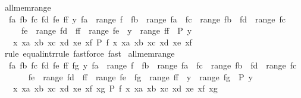 \begin{isabellebody}
{\isafoldproof}%
%
\isadelimproof
\isanewline
%
\endisadelimproof
\isanewline
{}\isamarkupfalse%
\ all{\isacharunderscore}{\kern0pt}mem{\isacharunderscore}{\kern0pt}range{}{\isacharcolon}{\kern0pt}\isanewline
\ \ {\isachardoublequoteopen}{\isacharparenleft}{\kern0pt}{\isasymAnd}fa\ fb\ fc\ fd\ fe\ ff\ y{\isachardot}{\kern0pt}\ fa\ {\isasymin}\ range\ f\ {\isasymLongrightarrow}\ fb\ {\isasymin}\ range\ fa\ {\isasymLongrightarrow}\ fc\ {\isasymin}\ range\ fb\ {\isasymLongrightarrow}\ fd\ {\isasymin}\ range\ fc\ {\isasymLongrightarrow}\isanewline
\ \ \ \ \ fe\ {\isasymin}\ range\ fd\ {\isasymLongrightarrow}\ ff\ {\isasymin}\ range\ fe\ {\isasymLongrightarrow}\ y\ {\isasymin}\ range\ ff\ {\isasymLongrightarrow}\ P\ y{\isacharparenright}{\kern0pt}\ {\isasymequiv}\isanewline
\ \ \ {\isacharparenleft}{\kern0pt}{\isasymAnd}x\ xa\ xb\ xc\ xd\ xe\ xf{\isachardot}{\kern0pt}\ P\ {\isacharparenleft}{\kern0pt}f\ x\ xa\ xb\ xc\ xd\ xe\ xf{\isacharparenright}{\kern0pt}{\isacharparenright}{\kern0pt}{\isachardoublequoteclose}\isanewline
%
\isadelimproof
\ \ %
\endisadelimproof
%
\isatagproof
{}\isamarkupfalse%
\ {\isacharparenleft}{\kern0pt}rule\ equal{\isacharunderscore}{\kern0pt}intr{\isacharunderscore}{\kern0pt}rule{\isacharparenright}{\kern0pt}\ {\isacharparenleft}{\kern0pt}fastforce{\isacharcomma}{\kern0pt}\ fast{\isacharparenright}{\kern0pt}%
\endisatagproof
{\isafoldproof}%
%
\isadelimproof
\isanewline
%
\endisadelimproof
\isanewline
{}\isamarkupfalse%
\ all{\isacharunderscore}{\kern0pt}mem{\isacharunderscore}{\kern0pt}range{}{\isacharcolon}{\kern0pt}\isanewline
\ \ {\isachardoublequoteopen}{\isacharparenleft}{\kern0pt}{\isasymAnd}fa\ fb\ fc\ fd\ fe\ ff\ fg\ y{\isachardot}{\kern0pt}\ fa\ {\isasymin}\ range\ f\ {\isasymLongrightarrow}\ fb\ {\isasymin}\ range\ fa\ {\isasymLongrightarrow}\ fc\ {\isasymin}\ range\ fb\ {\isasymLongrightarrow}\ fd\ {\isasymin}\ range\ fc\ {\isasymLongrightarrow}\isanewline
\ \ \ \ \ fe\ {\isasymin}\ range\ fd\ {\isasymLongrightarrow}\ ff\ {\isasymin}\ range\ fe\ {\isasymLongrightarrow}\ fg\ {\isasymin}\ range\ ff\ {\isasymLongrightarrow}\ y\ {\isasymin}\ range\ fg\ {\isasymLongrightarrow}\ P\ y{\isacharparenright}{\kern0pt}\ {\isasymequiv}\isanewline
\ \ \ {\isacharparenleft}{\kern0pt}{\isasymAnd}x\ xa\ xb\ xc\ xd\ xe\ xf\ xg{\isachardot}{\kern0pt}\ P\ {\isacharparenleft}{\kern0pt}f\ x\ xa\ xb\ xc\ xd\ xe\ xf\ xg{\isacharparenright}{\kern0pt}{\isacharparenright}{\kern0pt}{\isachardoublequoteclose}\isanewline
%
\isadelimproof
\ \ %
\endisadelimproof
%
\isatagproof
{}\isamarkupfalse%

\end{isabellebody}
